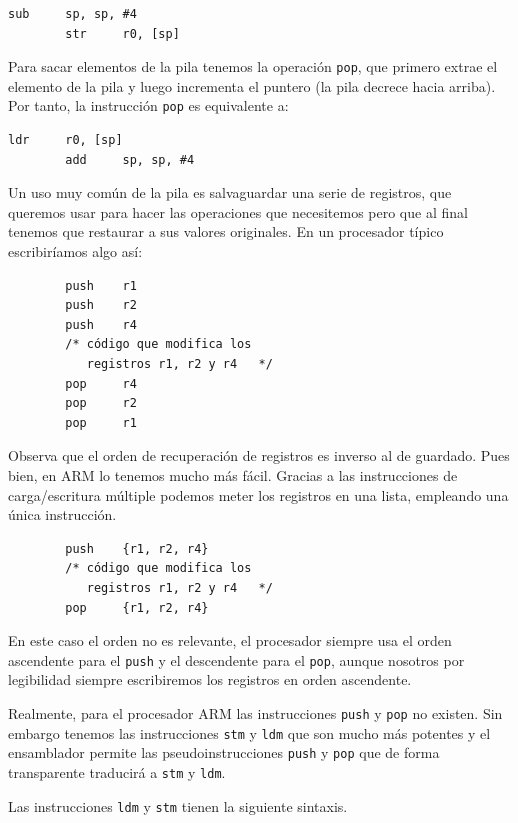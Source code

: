 \begin{lstlisting}[caption={Operación push}]
        sub     sp, sp, #4
        str     r0, [sp]
\end{lstlisting}

Para sacar elementos de la pila tenemos la operación {\tt pop}, que primero extrae
el elemento de la pila y luego incrementa el puntero (la pila decrece hacia arriba).
Por tanto, la instrucción {\tt pop} es equivalente a:

\begin{lstlisting}[caption={Operación pop}]
        ldr     r0, [sp]
        add     sp, sp, #4
\end{lstlisting}

Un uso muy común de la pila es salvaguardar una serie de registros, que queremos
usar para hacer las operaciones que necesitemos pero que al final tenemos que
restaurar a sus valores originales. En un procesador típico escribiríamos algo así:

\newpage
\begin{lstlisting}
        push    r1
        push    r2
        push    r4
        /* código que modifica los
           registros r1, r2 y r4   */
        pop     r4
        pop     r2
        pop     r1
\end{lstlisting}

Observa que el orden de recuperación de registros es inverso al de guardado. Pues
bien, en ARM lo tenemos mucho más fácil. Gracias a las instrucciones de carga/escritura
múltiple podemos meter los registros en una lista, empleando una única instrucción.

\begin{lstlisting}
        push    {r1, r2, r4}
        /* código que modifica los
           registros r1, r2 y r4   */
        pop     {r1, r2, r4}
\end{lstlisting}

En este caso el orden no es relevante, el procesador siempre usa el orden ascendente para
el {\tt push} y el descendente para el {\tt pop}, aunque nosotros por legibilidad siempre
escribiremos los registros en orden ascendente.

Realmente, para el procesador ARM las instrucciones {\tt push} y {\tt pop} no existen.
Sin embargo tenemos las
instrucciones {\tt stm} y {\tt ldm} que son mucho más potentes y el ensamblador
permite las pseudoinstrucciones {\tt push} y {\tt pop} que de forma transparente
traducirá a {\tt stm} y {\tt ldm}.

Las instrucciones {\tt ldm} y {\tt stm} tienen la siguiente sintaxis.

